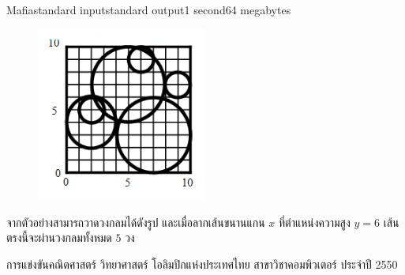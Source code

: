 \documentclass[11pt,a4paper]{article}
\begin{document}
\begin{problem}{Mafia}{standard input}{standard output}{1 second}{64 megabytes}
\begin{figure}[h]
\centering
\includegraphics[width=0.5\textwidth]{../latex/img/1042/1042-1.png}
\end{figure}

จากตัวอย่างสามารถวาดวงกลมได้ดังรูป และเมื่อลากเส้นขนานแกน $x$
ที่ตำแหน่งความสูง $y = 6$ เส้นตรงนี้จะผ่านวงกลมทั้งหมด $5$ วง

\Source

การแข่งขันคณิตศาสตร์ วิทยาศาสตร์ โอลิมปิกแห่งประเทศไทย สาขาวิชาคอมพิวเตอร์ ประจำปี 2550

\end{problem}
\end{document}
